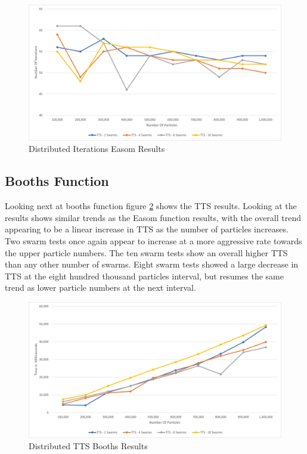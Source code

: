 \documentclass[oneside,12pt]{book}
\begin{document}
\begin{figure}[H]
    \centering
    \includegraphics[scale=0.45]{Images/Graphs/DistributedEasomEpoch.png}
    \caption{Distributed Iterations Easom Results}
    \label{fig:Distributed_Epoc_Easom_Results}
\end{figure}

\subsection{Booths Function}
Looking next at booths function figure \ref{fig:Distributed_TTS_Booths_Results} shows the TTS results. Looking at the results shows similar trends as the Easom function results, with the overall trend appearing to be a linear increase in TTS as the number of particles increases. Two swarm tests once again appear to increase at a more aggressive rate towards the upper particle numbers. The ten swarm tests show an overall higher TTS than any other number of swarms. Eight swarm tests showed a large decrease in TTS at the eight hundred thousand particles interval, but resumes the same trend as lower particle numbers at the next interval. 

\begin{figure}[H]
    \centering
    \includegraphics[scale=0.45]{Images/Graphs/DistributedBoothsTTS.png}
    \caption{Distributed TTS Booths Results}
    \label{fig:Distributed_TTS_Booths_Results}
\end{figure}
\end{document}
